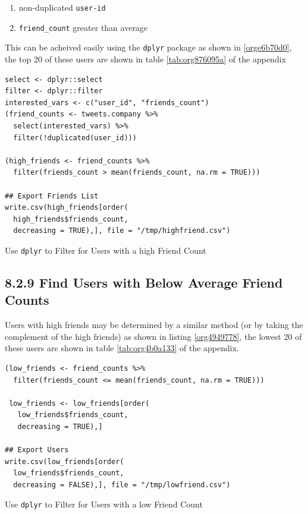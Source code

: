\documentclass[11pt]{article}
\begin{document}
\begin{enumerate}
\item non-duplicated \texttt{user-id}
\item \texttt{friend\_count} greater than average
\end{enumerate}

This can be acheived easily using the \texttt{dplyr} package as shown in \ref{orge6b70d0}, the top 20 of these users are shown in table \ref{tab:org876095a} of the appendix

\begin{listing}[htbp]
\begin{verbatim}
select <- dplyr::select
filter <- dplyr::filter
interested_vars <- c("user_id", "friends_count")
(friend_counts <- tweets.company %>%
  select(interested_vars) %>%
  filter(!duplicated(user_id)))

(high_friends <- friend_counts %>%
  filter(friends_count > mean(friends_count, na.rm = TRUE)))

## Export Friends List
write.csv(high_friends[order(
  high_friends$friends_count,
  decreasing = TRUE),], file = "/tmp/highfriend.csv")
\end{verbatim}
\caption{\label{orge6b70d0}Use \texttt{dplyr} to Filter for Users with a high Friend Count}
\end{listing}


\subsection{8.2.9 Find Users with Below Average Friend Counts}
\label{sec:org21fb269}
Users with high friends may be determined by a similar method (or by taking the complement of the high friends) as shown in listing \ref{org4949778}, the lowest 20 of these users are shown in table \ref{tab:org4b0a133} of the appendix.

\begin{listing}[htbp]
\begin{verbatim}
(low_friends <- friend_counts %>%
  filter(friends_count <= mean(friends_count, na.rm = TRUE)))

 low_friends <- low_friends[order(
   low_friends$friends_count,
   decreasing = TRUE),]

## Export Users
write.csv(low_friends[order(
  low_friends$friends_count,
  decreasing = FALSE),], file = "/tmp/lowfriend.csv")
\end{verbatim}
\caption{\label{org4949778}Use \texttt{dplyr} to Filter for Users with a low Friend Count}
\end{listing}
\end{document}
